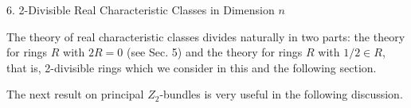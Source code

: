 6. 2-Divisible Real Characteristic Classes in Dimension $n$

The theory of real characteristic classes divides naturally in two parts: the theory for rings $R$ with $2R = 0$ (see Sec. 5) and the theory for rings $R$ with $1/2 \in R$, that is, 2-divisible rings which we consider in this and the following section.

The next result on principal $Z_2$-bundles is very useful in the following discussion.
